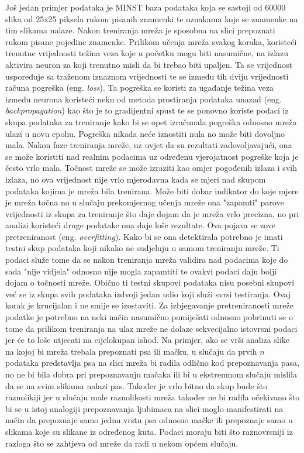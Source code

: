 \documentclass[times, utf8, diplomski]{fer}
\begin{document}
Još jedan primjer podataka je MINST baza podataka koja se sastoji od 60000 slika od 25x25 piksela
rukom pisanih znamenki te oznakama koje se znamenke na tim slikama nalaze. Nakon treniranja mreža je sposobna
na slici prepoznati rukom pisane pojedine znamenke. Prilikom učenja mreža svakog koraka, koristeći trenutne
vrijednosti težina veza koje u početku mogu biti nasumične, na izlazu aktivira neuron za koji trenutno misli
da bi trebao biti upaljen. Ta se vrijednost uspoređuje sa traženom iznaznom vrijednosti te se između tih dviju
vrijednosti računa pogreška (eng. \textit{loss}). Ta pogreška se koristi za ugađanje težina veza između neurona
koristeći neku od metoda prostiranja podataka unazad (eng. \textit{backpropagation}) kao što je to gradijentni
spust te se ponovno koriste podaci iz skupa podataka za treniranje kako bi se opet izračunala pogreška
odnosno mreža ulazi u novu epohu.
Pogreška nikada neće iznostiti nula no može biti dovoljno mala. Nakon faze treniranja mreže, uz uvjet da su
rezultati zadovoljavajući, ona se može koristiti nad realnim podacima uz određenu vjerojatnost pogreške koja
je često vrlo mala. Točnost mreže se može izraziti kao omjer pogođenih izlaza i svih izlaza, no ova vrijednost
nije vrlo mjerodavna kada se mjeri nad skupom podataka kojima je mreža bila trenirana. Može biti dobar indikator
do koje mjere je mreža točna no u slučaju prekomjernog učenja mreže ona "zapamti" parove vrijednosti iz skupa
za treniranje što daje dojam da je mreža vrlo precizna, no pri analizi koristeći druge podatake ona daje loše rezultate.
Ova pojava se zove pretreniranost (eng. \textit{overfitting}). Kako bi se ona detektirala potrebno je imati
testni skup podataka koji nikako ne sudjeluju u samom treniranju mreže. Ti podaci služe tome da se nakon treniranja
mreža validira nad podacima koje do sada "nije vidjela" odnosno nije mogla zapamtiti
te ovakvi podaci daju bolji dojam o točnosti mreže. Obično ti testni skupovi podataka nisu posebni skupovi već
se iz skupa svih podataka izdvoji jedan udio koji služi svrsi testiranja. Ovaj korak je krucijalan i
ne smije se izostaviti. Za izbjegavanje pretreniranosti mreže podatke je potrebno na neki način nasumično
pomiješati odnosno pobrinuti se o tome da prilikom treniranja na ulaz mreže ne dolaze sekvecijalno istovrsni
podaci jer će to loše utjecati na cijelokupan ishod. Na primjer, ako se vrši analiza slike na kojoj bi mreža
trebala prepoznati psa ili mačku, u slučaju da prvih $n$ podataka predstavlja psa na slici mreža bi radila odlično
kod prepoznavanja pasa, no ne bi bila dobra pri prepoznavanju mačaka ili bi u ekstremnom slučaju mislila da se
na svim slikama nalazi pas. Također je vrlo bitno da skup bude što raznolikiji jer u slučaju male raznolikosti
mreža također ne bi radila očekivano što bi se u istoj analogiji prepoznavanja ljubimaca na slici moglo
manifestirati na način da prepoznaje samo jednu vrstu psa odnosno mačke ili prepoznaje samo u slikama koje su
slikane iz određenog kuta. Podaci moraju biti što raznovrsniji iz razloga što se zahtjeva od mreže da radi u
nekom općem slučaju.
\end{document}
